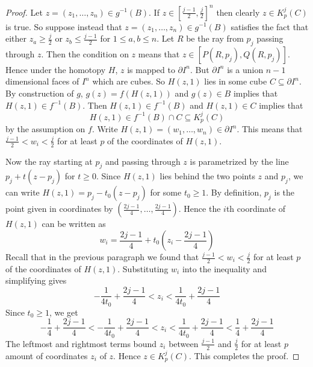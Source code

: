 \begin{lmm}{}{}
\begin{proof}
Let $z=(z_1,\dots,z_n)\in g^{-1}(B)$. If $z\in\left[\frac{j-1}{2},\frac{j}{2}\right]^n$ then clearly $z\in K_p^j(C)$ is true. So suppose instead that $z=(z_1,\dots,z_n)\in g^{-1}(B)$ satisfies the fact that either $z_a\geq\frac{j}{2}$ or $z_b\leq\frac{j-1}{2}$ for $1\leq a,b\leq n$. Let $R$ be the ray from $p_j$ passing through $z$. Then the condition on $z$ means that $z\in[P(R,p_j),Q(R,p_j)]$. Hence under the homotopy $H$, $z$ is mapped to $\partial I^n$. But $\partial I^n$ is a union $n-1$ dimensional faces of $I^n$ which are cubes. So $H(z,1)$ lies in some cube $C\subseteq\partial I^n$. By construction of $g$, $g(z)=f(H(z,1))$ and $g(z)\in B$ implies that $H(z,1)\in f^{-1}(B)$. Then $H(z,1)\in f^{-1}(B)$ and $H(z,1)\in C$ implies that $$H(z,1)\in f^{-1}(B)\cap C\subseteq K_p^j(C)$$ by the assumption on $f$. Write $H(z,1)=(w_1,\dots,w_n)\in\partial I^n$. This means that $\frac{j-1}{2}<w_i<\frac{j}{2}$ for at least $p$ of the coordinates of $H(z,1)$. 

Now the ray starting at $p_j$ and passing through $z$ is parametrized by the line $p_j+t(z-p_j)$ for $t\geq 0$. Since $H(z,1)$ lies behind the two points $z$ and $p_j$, we can write $H(z,1)=p_j-t_0(z-p_j)$ for some $t_0\geq 1$. By definition, $p_j$ is the point given in coordinates by $\left(\frac{2j-1}{4},\dots,\frac{2j-1}{4}\right)$. Hence the $i$th coordinate of $H(z,1)$ can be written as $$w_i=\frac{2j-1}{4}+t_0\left(z_i-\frac{2j-1}{4}\right)$$ Recall that in the previous paragraph we found that $\frac{j-1}{2}<w_i<\frac{j}{2}$ for at least $p$ of the coordinates of $H(z,1)$. Substituting $w_i$ into the inequality and simplifying gives $$-\frac{1}{4t_0}+\frac{2j-1}{4}<z_i<\frac{1}{4t_0}+\frac{2j-1}{4}$$ Since $t_0\geq 1$, we get $$-\frac{1}{4}+\frac{2j-1}{4}<-\frac{1}{4t_0}+\frac{2j-1}{4}<z_i<\frac{1}{4t_0}+\frac{2j-1}{4}<\frac{1}{4}+\frac{2j-1}{4}$$ The leftmost and rightmost terms bound $z_i$ between $\frac{j-1}{2}$ and $\frac{j}{2}$ for at least $p$ amount of coordinates $z_i$ of $z$. Hence $z\in K_p^j(C)$. This completes the proof. 
\end{proof}
\end{lmm}

